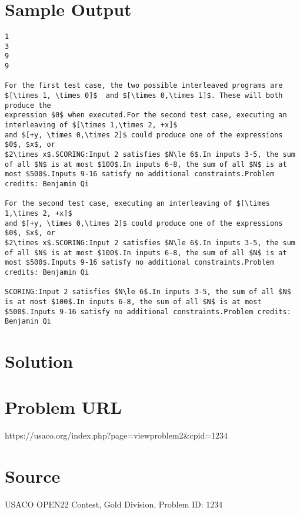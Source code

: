 \documentclass[12pt]{article}
\begin{document}
\section*{Sample Output}
\begin{verbatim}
1
3
9
9

For the first test case, the two possible interleaved programs are
$[\times 1, \times 0]$  and $[\times 0,\times 1]$. These will both produce the
expression $0$ when executed.For the second test case, executing an interleaving of $[\times 1,\times 2, +x]$
and $[+y, \times 0,\times 2]$ could produce one of the expressions $0$, $x$, or
$2\times x$.SCORING:Input 2 satisfies $N\le 6$.In inputs 3-5, the sum of all $N$ is at most $100$.In inputs 6-8, the sum of all $N$ is at most $500$.Inputs 9-16 satisfy no additional constraints.Problem credits: Benjamin Qi

For the second test case, executing an interleaving of $[\times 1,\times 2, +x]$
and $[+y, \times 0,\times 2]$ could produce one of the expressions $0$, $x$, or
$2\times x$.SCORING:Input 2 satisfies $N\le 6$.In inputs 3-5, the sum of all $N$ is at most $100$.In inputs 6-8, the sum of all $N$ is at most $500$.Inputs 9-16 satisfy no additional constraints.Problem credits: Benjamin Qi

SCORING:Input 2 satisfies $N\le 6$.In inputs 3-5, the sum of all $N$ is at most $100$.In inputs 6-8, the sum of all $N$ is at most $500$.Inputs 9-16 satisfy no additional constraints.Problem credits: Benjamin Qi
\end{verbatim}

\section*{Solution}


\section*{Problem URL}
https://usaco.org/index.php?page=viewproblem2&cpid=1234

\section*{Source}
USACO OPEN22 Contest, Gold Division, Problem ID: 1234
\end{document}
